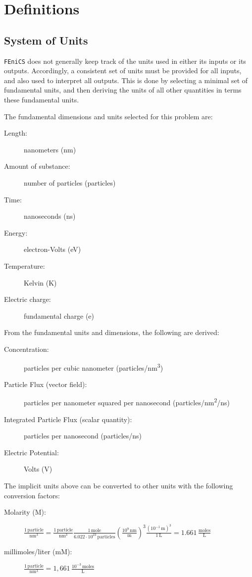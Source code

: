 
\section{Definitions}

\subsection{System of Units}\label{subsec:units}

\texttt{FEniCS} does not generally keep track of the units used in either its inputs or its outputs.
Accordingly, a consistent set of units must be provided for all inputs,
and also used to interpret all outputs.
This is done by selecting a minimal set of fundamental units,
and then deriving the units of all other quantities in terms
these fundamental units.

The fundamental dimensions and units selected for this problem are:
\begin{description}
  \item [Length:] nanometers (nm)
  \item [Amount of substance:] number of particles (particles)
  \item [Time:] nanoseconds (ns)
  \item [Energy:] electron-Volts (eV)
  \item [Temperature:] Kelvin (K)
  \item [Electric charge:] fundamental charge (e)
\end{description}

From the fundamental units and dimensions, the following are derived:
\begin{description}
  \item [Concentration:] particles per cubic nanometer (particles/nm\textsuperscript{3})
  \item [Particle Flux (vector field):] particles per nanometer squared per nanosecond (particles/nm\textsuperscript{2}/ns)
  \item [Integrated Particle Flux (scalar quantity):] particles per nanosecond (particles/ns)
  \item [Electric Potential:] Volts (V)
\end{description}

The implicit units above can be converted to other units with the following conversion factors:
\begin{description}
  \item [Molarity (M):]
  $\frac{1 \,\mathrm{particle}}{\mathrm{nm}^3} = \frac{1 \,\mathrm{particle}}{\mathrm{nm}^3}
  \frac{1 \,\mathrm{mole}}{6.022 \cdot 10^{23} \,\mathrm{particles}} \left(\frac{10^9 \,\mathrm{nm}}{\mathrm{m}}\right)^3 
  \frac{(10^{-1}\,\mathrm{m})^3}{1 \,\mathrm{L}}
  = 1.661 \,\frac{\mathrm{moles}}{\mathrm{L}}$
  \item [millimoles/liter (mM):] $\frac{1 \,\mathrm{particle}}{\mathrm{nm}^3} = 1,661 \,\frac{10^{-3}\,\mathrm{moles}}{\mathrm{L}}$
\end{description}

